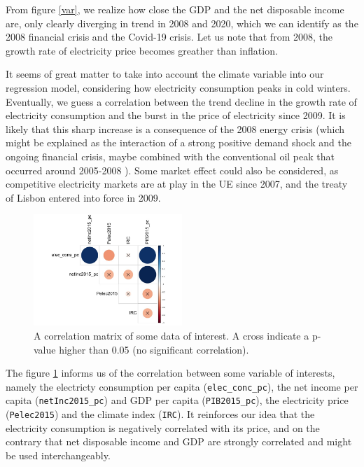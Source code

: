 From figure \ref{var}, we realize how close the GDP and the net disposable income are, only clearly diverging in trend in 2008 and 2020, which we can identify as the 2008 financial crisis and the Covid-19 crisis. Let us note that from 2008, the growth rate of electricity price becomes greather than inflation.

It seems of great matter to take into account the climate variable into our regression model, considering how electricity consumption peaks in cold winters. Eventually, we guess a correlation between the trend decline in the growth rate of electricity consumption and the burst in the price of electricity since 2009. It is likely that this sharp increase is a consequence of the 2008 energy crisis (which might be explained as the interaction of a strong positive demand shock and the ongoing financial crisis, maybe combined with the conventional oil peak that occurred around 2005-2008 \cite{delannoy2021peak}). Some market effect could also be considered, as competitive electricity markets are at play in the UE since 2007, and the treaty of Lisbon entered into force in 2009.

\begin{figure}[h]
    \centering
    \includegraphics[width=0.5\textwidth, trim={0 0 0 5pt}, clip]{Images/correlation_matrix.jpeg}
        \caption{A correlation matrix of some data of interest. A cross indicate a p-value higher than 0.05 (no significant correlation).}
    \label{corr_mat}
  \end{figure}

The figure \ref{corr_mat} informs us of the correlation between some variable of interests, namely the electricty consumption per capita (\texttt{elec\_conc\_pc}), the net income per capita (\texttt{netInc2015\_pc}) and GDP per capita (\texttt{PIB2015\_pc}), the electricity price (\texttt{Pelec2015}) and the climate index (\texttt{IRC}). It reinforces our idea that the electricity consumption is negatively correlated with its price, and on the contrary that net disposable income and GDP are strongly correlated and might be used interchangeably.


